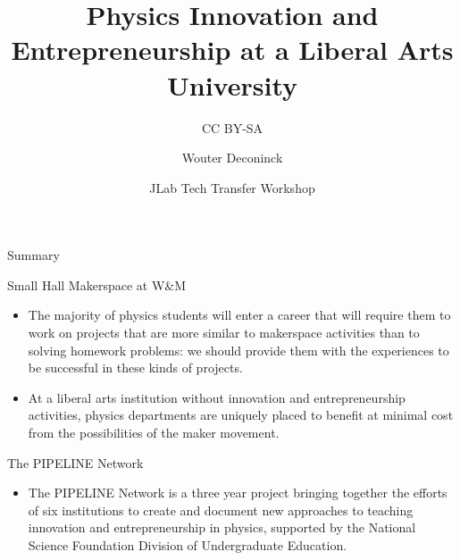 \documentclass[xcolor={dvipsnames},professionalfonts]{beamer}
\title{Physics Innovation and Entrepreneurship at a Liberal Arts University}
\subtitle{CC BY-SA}
\author{Wouter Deconinck}
\date{JLab Tech Transfer Workshop}
\begin{document}
%


\begin{frame}[plain]
 \maketitle
\end{frame}

\begin{frame}[label=summary]{Summary}
 \begin{block}{Small Hall Makerspace at W\&M}
  \begin{itemize}
   \item The majority of physics students will enter a career that will require them to work on projects that are more similar to makerspace activities than to solving homework problems: we should provide them with the experiences to be successful in these kinds of projects.
   \item At a liberal arts institution without innovation and entrepreneurship activities, physics departments are uniquely placed to benefit at minimal cost from the possibilities of the maker movement.
  \end{itemize}
 \end{block}
 \begin{block}{The PIPELINE Network}
  \begin{itemize}
   \item The PIPELINE Network is a three year project bringing together the efforts of six institutions to create and document new approaches to teaching innovation and entrepreneurship in physics, supported by the National Science Foundation Division of Undergraduate Education.
  \end{itemize}
 \end{block}
\end{frame}
\end{document}
